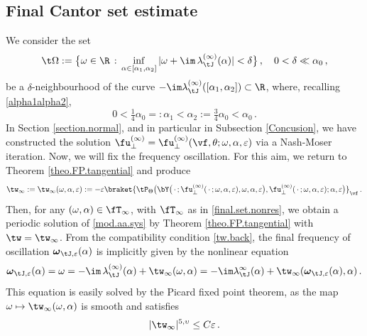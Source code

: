 \documentclass[a4paper,reqno,10pt]{article}
\newcommand{\bomega}{{\boldsymbol{\omega}}}
\begin{document}
\subsection{Final Cantor set estimate}
We consider the set
\begin{equation}\label{Omega-neighb}
	\t\Omega := \big\{\omega \in \R \,:\, \inf_{\alpha\in[\alpha_{1},\alpha_{2}]} |\omega + \im\,\lambda_{\tJ}^{(\infty)}(\alpha)|<\delta \big\} \,, \quad 0<\delta\ll \alpha_{0} \,,
\end{equation}
be a $\delta$-neighbourhood of the curve ${-\im}\lambda_{\tJ}^{(\infty)}([\alpha_{1},\alpha_{2}])\subset \R$, where, recalling \eqref{alpha1alpha2}, 
\begin{equation}
	0<\tfrac14 \alpha_{0}=: \alpha_{1} < \alpha_{2} := \tfrac34 \alpha_{0}<\alpha_{0} \,.
\end{equation}
In Section \ref{section.normal}, and in particular in Subsection \ref{Concusion}, we have constructed the solution $\fu_{\perp}^{(\infty)}= \fu_{\perp}^{(\infty)}(\vf,\theta;\omega,\alpha,\varepsilon)$  via a Nash-Moser iteration. Now, we will  fix the frequency oscillation. For this aim, we 
return to Theorem \ref{theo.FP.tangential}  and produce
\begin{equation}
	\tw_{\infty}:= \tw_{\infty}(\omega,\alpha,\varepsilon) := -\varepsilon\braket{\tP_{\Theta}\big(\bY   \big(\,\cdot\,;\fu_{\perp}^{(\infty)}(\,\cdot\,;\omega,\alpha,\varepsilon),\omega,\alpha,\varepsilon\big),\fu_{\perp}^{(\infty)}(\,\cdot\,;\omega,\alpha,\varepsilon);\alpha,\varepsilon\big)}_{\vf}\,.
\end{equation}
Then, for any $(\omega,\alpha)\in \fT_{\infty}$, with $\fT_{\infty}$ as in \eqref{final.set.nonres},
we obtain a periodic solution of \eqref{mod.aa.sys} by Theorem \ref{theo.FP.tangential} with $\tw=\tw_\infty$. From the compatibility condition \eqref{tw.back}, the final frequency of oscillation $\bomega_{\tJ,\varepsilon}(\alpha)$ is implicitly given by the nonlinear equation
\begin{equation}\label{implicit.final.freq}
	\bomega_{\tJ,\varepsilon}(\alpha)=\omega= -\im\,\lambda_{\tJ}^{(\infty)}(\alpha)+ \tw_{\infty}(\omega,\alpha)= -\im\lambda_{\tJ}^{\infty}(\alpha)+ \tw_{\infty}(\bomega_{\tJ,\varepsilon}(\alpha),\alpha)\,.
\end{equation}
This equation is easily  solved by the Picard fixed point theorem, as the map $\omega \mapsto \tw_{\infty}(\omega,\alpha)$ is smooth and satisfies
\begin{equation}\label{hostel1}
	|\tw_{\infty}|^{5,\upsilon} \leq C \varepsilon \,. 
\end{equation}
\end{document}
